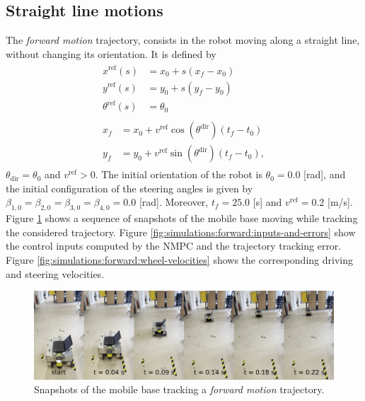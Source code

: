 \subsection{Straight line motions}
The \textit{forward motion} trajectory, consists in the robot moving along a straight line, without changing its orientation. It is defined by
\begin{equation*}
\renewcommand{\arraystretch}{1.3}
\begin{array}{c}
    \begin{aligned}
        x^{\mathrm{ref}}(s) &= x_0 + s (x_f - x_0) \\
        y^{\mathrm{ref}}(s) &= y_0 + s (y_f - y_0) \\
        \theta^{\mathrm{ref}}(s) &= \theta_0
    \end{aligned}  \\
    \begin{aligned}
        x_f &= x_0 + v^{\mathrm{ref}} \cos(\theta^{\mathrm{dir}}) (t_f - t_0) \\
        y_f &= y_0 + v^{\mathrm{ref}} \sin(\theta^{\mathrm{dir}}) (t_f - t_0),
     \end{aligned}
\end{array}
\end{equation*}
$\theta_{\mathrm{dir}}=\theta_0$ and $v^{\mathrm{ref}}>0$. The initial orientation of the robot is $\theta_0=0.0$ [rad], and the initial configuration of the steering angles is given by$\beta_{1,0}=\beta_{2,0}=\beta_{3,0}=\beta_{4,0}=0.0$ [rad]. Moreover, $t_f = 25.0$ [s] and $v^{\mathrm{ref}}=0.2$ [m/s]. Figure \ref{fig:experiments:forward:snapshots} shows a sequence of snapshots of the mobile base moving while tracking the considered trajectory. Figure \ref{fig:simulations:forward:inputs-and-errors} show the control inputs computed by the NMPC and the trajectory tracking error. Figure \ref{fig:simulations:forward:wheel-velocities} shows the corresponding driving and steering velocities.
\begin{figure}
    \centering
    \includegraphics[width=\textwidth]{figures/SWMR/simulations/forward/snapshots.jpeg}
    \caption{Snapshots of the mobile base tracking a \textit{forward motion} trajectory.}
    \label{fig:experiments:forward:snapshots}
\end{figure}
